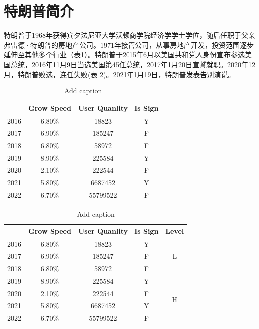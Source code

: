 \documentclass[a4paper,11pt]{ctexart}
\begin{document}
	\section{特朗普简介}
	特朗普于1968年获得宾夕法尼亚大学沃顿商学院经济学学士学位，随后任职于父亲弗雷德·特朗普的房地产公司。1971年接管公司，从事房地产开发，投资范围逐步延伸至其他多个行业（表\ref{tab:addlabel1}）。特朗普于2015年6月以美国共和党人身份宣布参选美国总统，2016年11月9日当选美国第45任总统，2017年1月20日宣誓就职。2020年12月，特朗普败选，连任失败(表 \ref{tab:addlabel2})。2021年1月19日，特朗普发表告别演说。
	\begin{table}[H]
		\centering
		\caption{Add caption}
		\begin{tabular}{cccc}
			\toprule
			& Grow Speed & User Quanlity & Is Sign \\
			\midrule
			2016  & 6.80\% & 18823 & Y \\
			2017  & 6.90\% & 185247 & F \\
			2018  & 6.80\% & 58972 & F \\
			2019  & 8.90\% & 225584 & Y \\
			2020  & 2.10\% & 222544 & F \\
			2021  & 5.80\% & 6687452 & Y \\
			2022  & 6.70\% & 55799522 & F \\
			\bottomrule
		\end{tabular}%
		\label{tab:addlabel1}%
	\end{table}%
	
	\begin{table}[H]
		\centering
		\caption{Add caption}
		\begin{tabular}{ccccc}
			\toprule
			& Grow Speed & User Quanlity & Is Sign & Level \\
			\midrule
			2016  & 6.80\% & 18823 & Y     & \multirow{3}[1]{*}{L} \\
			2017  & 6.90\% & 185247 & F     &  \\
			2018  & 6.80\% & 58972 & F     &  \\
			2019  & 8.90\% & 225584 & Y     & \multirow{4}[1]{*}{H} \\
			2020  & 2.10\% & 222544 & F     &  \\
			2021  & 5.80\% & 6687452 & Y     &  \\
			2022  & 6.70\% & 55799522 & F     &  \\
			\bottomrule
		\end{tabular}%
		\label{tab:addlabel2}%
	\end{table}%
	
	\clearpage
	
\end{document}
